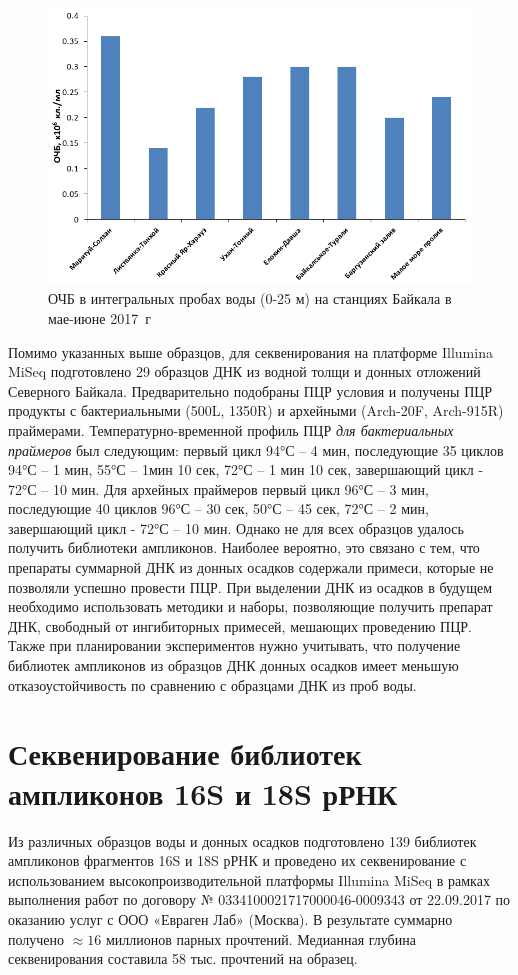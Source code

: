 \documentclass[a4paper,12pt,openany,final]{extreport}
\def\oldcaption{} \let\oldcaption=\caption
\def\caption{\stepcounter{captionsnum}\oldcaption}
\begin{document}
\begin{figure}
  \centering
\includegraphics[width=0.8\linewidth]{media/chart.png}
\caption{ОЧБ в интегральных пробах воды (0-25 м) на станциях Байкала в
мае-июне 2017~г}\label{fig:chart}
\end{figure}


Помимо указанных выше образцов, для секвенирования на платформе Illumina
MiSeq подготовлено 29 образцов ДНК из водной толщи и донных отложений
Северного Байкала. Предварительно подобраны ПЦР условия и получены ПЦР
продукты с бактериальными (500L, 1350R) и архейными (Arch-20F,
Arch-915R) праймерами. Температурно-временной профиль ПЦР \emph{для
бактериальных праймеров} был следующим: первый цикл 94°С -- 4 мин,
последующие 35 циклов 94°С -- 1 мин, 55°С -- 1мин 10 сек, 72°С -- 1 мин
10 сек, завершающий цикл - 72°С -- 10 мин. Для {архейных праймеров}
первый цикл 96°С -- 3 мин, последующие 40 циклов 96°С -- 30 сек, 50°С --
45 сек, 72°С -- 2 мин, завершающий цикл - 72°С -- 10 мин.  Однако не для всех образцов удалось получить библиотеки ампликонов. Наиболее вероятно, это связано с тем, что препараты суммарной ДНК из донных осадков содержали примеси, которые не позволяли успешно провести ПЦР. При выделении ДНК из осадков в будущем необходимо использовать методики и наборы, позволяющие получить препарат ДНК, свободный от ингибиторных примесей, мешающих проведению ПЦР. Также при планировании экспериментов нужно учитывать, что получение библиотек ампликонов из образцов ДНК донных осадков имеет меньшую отказоустойчивость по сравнению с образцами ДНК из проб воды.

\section{Секвенирование библиотек ампликонов 16S и 18S рРНК}

Из различных образцов воды и донных осадков подготовлено 139 библиотек
ампликонов фрагментов 16S и 18S рРНК и проведено их секвенирование с
использованием высокопроизводительной платформы Illumina MiSeq в рамках выполнения работ по договору № 0334100021717000046-0009343 от 22.09.2017 по оказанию услуг с ООО «Евраген Лаб» (Москва). В результате суммарно получено
\(\approx{}\!\!16\) миллионов парных прочтений. Медианная глубина
секвенирования составила 58 тыс. прочтений на образец.
\end{document}
